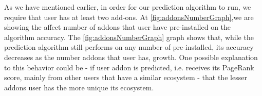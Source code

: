 \documentclass[11pt,oneside]{book}
\begin{document}

As we have mentioned earlier, in order for our prediction algorithm to
run, we require that user has at least two add-ons. At
\autoref{fig:addonsNumberGraph},we are showing the affect number of
addons that user have pre-installed on the algorithm accuracy. The
\autoref{fig:addonsNumberGraph} graph shows that, while the prediction
algorithm still performs on any number of pre-installed, its accuracy
decreases as the number addons that user has, growth. One possible
explanation to this behavior could be - if user addon is predicted,
i.e. receives its PageRank score, mainly from other users that have a
similar ecosystem - that the lesser addons user has the more unique
its ecosystem.
\end{document}

